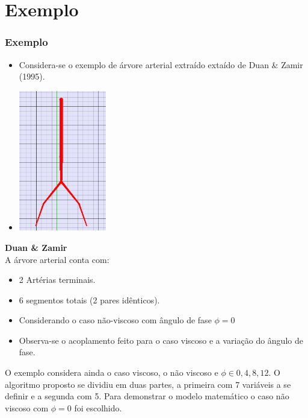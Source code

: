 \documentclass[10pt]{beamer}
\theoremstyle{remark}
\theoremstyle{definition}
\begin{document}
	\section{Exemplo}
	\begin{frame}[allowframebreaks]
		\frametitle{Exemplo}
		
		\begin{itemize}
			\item Considera-se o exemplo de árvore arterial extraído extaído de Duan \& Zamir (1995).
			\item \begin{center}
						 \includegraphics[width=0.3\textwidth]{images/IGU2.png}
					 \end{center}			 
			
			
		\end{itemize}
		
		\framebreak

			\textbf{Duan \& Zamir} \\
			
			A árvore arterial conta com:
		
		\begin{itemize}
			\item 2 Artérias terminais.
			\item 6 segmentos totais (2 pares idênticos).
			\item Considerando o caso não-viscoso com ângulo de fase $\phi = 0$
			\item Observa-se o acoplamento feito para o caso viscoso e a variação do ângulo de fase.
			
		\end{itemize}
		
		O exemplo considera ainda o caso viscoso, o não viscoso e  $\phi \in {0,4,8,12}$. O algoritmo proposto se dividiu em duas partes, a primeira com 7 variáveis a se definir e a segunda com 5. Para demonstrar o modelo matemático o caso não viscoso com $\phi = 0$ foi escolhido.
		

\end{frame}
\end{document}
